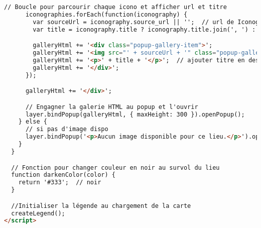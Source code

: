 \begin{lstlisting}[language=HTML, caption=Script JavaScript]
      // Boucle pour parcourir chaque icono et afficher url et titre
      iconographies.forEach(function(iconography) {
        var sourceUrl = iconography.source_url || '';  // url de Iconography
        var title = iconography.title ? iconography.title.join(', ') : 'Untitled';  // Joindre les titres si plusieurs (à revoir pour éviter de surcharger info)

        galleryHtml += '<div class="popup-gallery-item">';
        galleryHtml += '<img src="' + sourceUrl + '" class="popup-gallery-image" alt="' + title + '"/>';  //afficher image ou lien au click droit
        galleryHtml += '<p>' + title + '</p>';  // ajouter titre en dessous de chaque image
        galleryHtml += '</div>';
      });

      galleryHtml += '</div>';

      // Engagner la galerie HTML au popup et l'ouvrir 
      layer.bindPopup(galleryHtml, { maxHeight: 300 }).openPopup();
    } else {
      // si pas d'image dispo
      layer.bindPopup('<p>Aucun image disponible pour ce lieu.</p>').openPopup();
    }
  }

  // Fonction pour changer couleur en noir au survol du lieu
  function darkenColor(color) {
    return '#333';  // noir
  }

  //Initialiser la légende au chargement de la carte 
  createLegend();
</script>
\end{lstlisting}